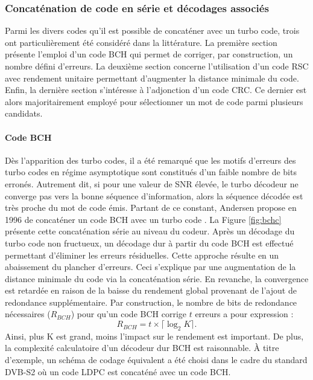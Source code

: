 
\subsubsection{Concaténation de code en série et décodages associés}
Parmi les divers codes qu'il est possible de concaténer avec un turbo code, trois ont particulièrement été considéré 
dans la littérature. La première section présente l'emploi d'un code BCH qui permet de corriger, par construction, un 
nombre défini d'erreurs. La deuxième section concerne l'utilisation d'un code RSC avec rendement unitaire permettant 
d'augmenter la distance minimale du code. Enfin, la dernière section s'intéresse à l'adjonction d'un code CRC. Ce 
dernier est alors majoritairement employé pour sélectionner un mot de code parmi plusieurs candidats.
\paragraph{Code BCH}
Dès l'apparition des turbo codes, il a été remarqué que les motifs d'erreurs des turbo codes en régime asymptotique sont 
constitués d'un faible nombre de bits erronés. Autrement dit, si pour une valeur de SNR élevée, le turbo décodeur ne 
converge pas vers la bonne séquence d'information, alors la séquence décodée est très proche du mot de code émis. 
Partant de ce constant, Andersen propose en 1996 de concaténer un code BCH avec un turbo code \cite{andersenBCH}. La 
Figure \ref{fig:bchc} présente cette concaténation série au niveau du codeur. Après un décodage du turbo code non 
fructueux, un décodage dur à partir du code BCH est effectué permettant d'éliminer les erreurs résiduelles. Cette 
approche résulte en un abaissement du plancher d'erreurs. Ceci s'explique par une augmentation de la distance minimale 
du code via la concaténation série. En revanche, la convergence est retardée en raison de la baisse du rendement global 
provenant de l'ajout de redondance supplémentaire. Par construction, le nombre de bits de redondance nécessaires ($R_{BCH}$)
pour 
qu'un code BCH corrige $t$ erreurs a pour expression : \[R_{BCH} = t \times \lceil \log_2 K\rceil.\]
Ainsi, plus K est grand, moins l'impact sur le rendement est important. De plus, la complexité calculatoire d'un 
décodeur dur BCH est raisonnable. À titre d'exemple, un schéma de codage équivalent a été choisi dans le cadre du 
standard DVB-S2 où  un code LDPC est concaténé avec un code BCH.

